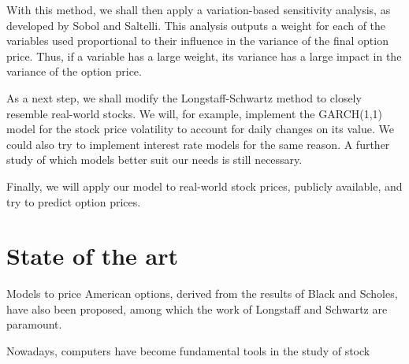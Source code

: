 \documentclass[a4paper,prd,twocolumn,nofootinbib,superscriptaddress,floatfix]{revtex4}
\begin{document}
With this method, we shall then apply a variation-based sensitivity analysis, as developed by Sobol and Saltelli. This analysis outputs a weight for each of the variables used proportional to their influence in the variance of the final option price.
Thus, if a variable has a large weight, its variance has a large impact in the variance of the option price.

As a next step, we shall modify the Longstaff-Schwartz method to closely resemble real-world stocks. We will, for example, implement the GARCH(1,1) model for the stock price volatility to account for daily changes on its value. We could also try to implement interest rate models for the same reason.
A further study of which models better suit our needs is still necessary.

Finally, we will apply our model to real-world stock prices, publicly available, and try to predict option prices.

\section{State of the art}


Models to price American options, derived from the results of Black and Scholes, have also been proposed, among which the work of Longstaff and Schwartz are paramount.


Nowadays, computers have become fundamental tools in the study of stock


\iffalse
\end{document}
